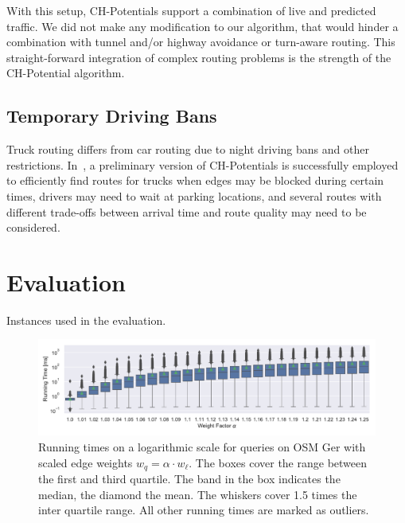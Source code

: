 \documentclass[letterpaper]{article} %
\begin{document}
With this setup, CH-Potentials support a combination of live and predicted traffic.
We did not make any modification to our algorithm, that would hinder a combination with tunnel and/or highway avoidance or turn-aware routing.
This straight-forward integration of complex routing problems is the strength of the CH-Potential algorithm.

\subsection{Temporary Driving Bans}

Truck routing differs from car routing due to night driving bans and other restrictions.
In~\cite{kswz-erptd-20}, a preliminary version of CH-Potentials is successfully employed to efficiently find routes for trucks when edges may be blocked during certain times, drivers may need to wait at parking locations, and several routes with different trade-offs between arrival time and route quality may need to be considered.

\section{Evaluation}

\label{sec:experiments}

\begin{table}
\centering
\caption{Instances used in the evaluation.}\label{tab:graphs}

\end{table}

\begin{figure}
\centering
\includegraphics[width=\textwidth]{fig/scaled_weights.pdf}
\caption{
Running times on a logarithmic scale for queries on OSM Ger with scaled edge weights $w_q = \alpha \cdot w_\ell$.
The boxes cover the range between the first and third quartile.
The band in the box indicates the median, the diamond the mean.
The whiskers cover 1.5 times the inter quartile range.
All other running times are marked as outliers.
}\label{fig:scaled_weights}
\end{figure}
\end{document}
